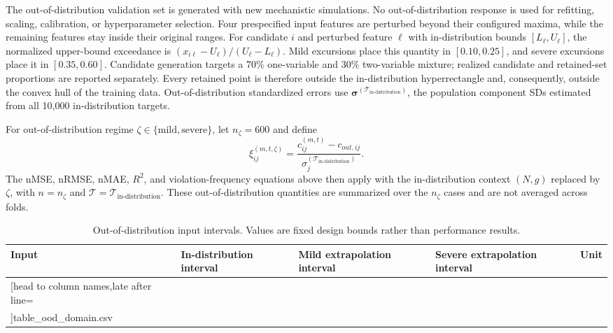 \documentclass[a4paper,fleqn]{cas-sc}
\newcommand{\csvrowsfive}[1]{%
  \csvreader[head to column names,late after line=\\]{#1}{}{\colA & \colB & \colC & \colD & \colE}}
\begin{document}
The out-of-distribution validation set is generated with new mechanistic simulations. No out-of-distribution response is used for refitting, scaling, calibration, or hyperparameter selection. Four prespecified input features are perturbed beyond their configured maxima, while the remaining features stay inside their original ranges. For candidate $i$ and perturbed feature $\ell$ with in-distribution bounds $[L_\ell,U_\ell]$, the normalized upper-bound exceedance is $(x_{i\ell}-U_\ell)/(U_\ell-L_\ell)$. Mild excursions place this quantity in $[0.10,0.25]$, and severe excursions place it in $[0.35,0.60]$. Candidate generation targets a 70\% one-variable and 30\% two-variable mixture; realized candidate and retained-set proportions are reported separately. Every retained point is therefore outside the in-distribution hyperrectangle and, consequently, outside the convex hull of the training data. Out-of-distribution standardized errors use $\boldsymbol{\sigma}^{(\mathcal{T}_{\mathrm{in\text{-}distribution}})}$, the population component SDs estimated from all 10,000 in-distribution targets.

For out-of-distribution regime $\zeta\in\{\mathrm{mild},\mathrm{severe}\}$, let $n_\zeta=600$ and define
\begin{equation}
\xi_{ij}^{(m,t,\zeta)}
=\frac{c_{ij}^{(m,t)}-c_{out,ij}}
{\sigma_j^{(\mathcal{T}_{\mathrm{in\text{-}distribution}})}}.
\end{equation}
The nMSE, nRMSE, nMAE, $R^2$, and violation-frequency equations above then apply with the in-distribution context $(N,g)$ replaced by $\zeta$, with $n=n_\zeta$ and $\mathcal{T}=\mathcal{T}_{\mathrm{in\text{-}distribution}}$. These out-of-distribution quantities are summarized over the $n_\zeta$ cases and are not averaged across folds.

\begin{table}[htbp]
\centering
\caption{Out-of-distribution input intervals. Values are fixed design bounds rather than performance results.}
\label{tab:ood_domain}
\scriptsize
\begin{tabular}{lllll}
\toprule
Input & In-distribution interval & Mild extrapolation interval & Severe extrapolation interval & Unit \\
\midrule
\csvrowsfive{table_ood_domain.csv}
\bottomrule
\end{tabular}
\end{table}
\end{document}
